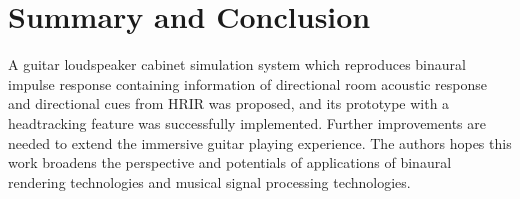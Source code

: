 \documentclass[convention,e-brief]{aesconf-current}
\begin{document}
\section{Summary and Conclusion}

A guitar loudspeaker cabinet simulation system which reproduces binaural impulse response containing information of directional room acoustic response and directional cues from HRIR was proposed, and its prototype with a headtracking feature was successfully implemented.
Further improvements are needed to extend the immersive guitar playing experience.
The authors hopes this work broadens the perspective and potentials of applications of binaural rendering technologies and musical signal processing technologies.





\end{document}
